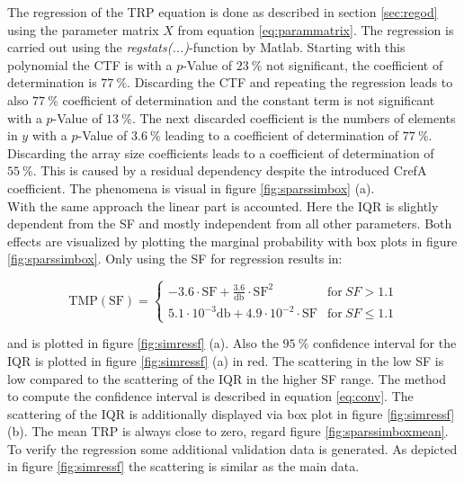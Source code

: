 The regression of the \ac{TRP} equation is done as described in section \ref{sec:regod} using the parameter matrix $X$ from equation \ref{eq:parammatrix}. The regression is carried out using the \textit{regstats(...)}-function by Matlab\texttrademark{}. Starting with this polynomial the \ac{CTF} is with a $p$-Value of $\SI{23}{\percent}$ not significant, the coefficient of determination is $\SI{77}{\percent}$. Discarding the \ac{CTF} and repeating the regression leads to also $\SI{77}{\percent}$ coefficient of determination and the constant term is not significant with a $p$-Value of $\SI{13}{\percent}$. The next discarded coefficient is the numbers of elements in $y$ with a  $p$-Value of $\SI{3.6}{\percent}$ leading to a coefficient of determination of $\SI{77}{\percent}$. Discarding the array size coefficients leads to a coefficient of determination of $\SI{55}{\percent}$. This is caused by a residual dependency despite the introduced \ac{CrefA} coefficient. The phenomena is visual in figure \ref{fig:sparssimbox} (a).\\
With the same approach the linear part is accounted. Here the \ac{IQR} is slightly dependent from the \ac{SF} and mostly independent from all other parameters. Both effects are visualized by plotting the marginal probability with box plots in figure \ref{fig:sparssimbox}. Only using the \ac{SF} for regression results in:

\begin{equation}
\text{TMP}\left(\text{SF}\right)=\begin{cases} -3.6\cdot\text{SF}+\frac{3.6}{\si{\decibel}}\cdot\text{SF}^2 & \text{for}\ SF>1.1\\
5.1\cdot 10^{-3}\si{\decibel}+4.9\cdot 10^{-2}\cdot \text{SF} & \text{for}\ SF\le 1.1\end{cases}
\end{equation}

and is plotted in figure \ref{fig:simressf} (a). Also the $\SI{95}{\percent}$ confidence interval for the \ac{IQR} is plotted in figure \ref{fig:simressf} (a) in red. The scattering in the low \ac{SF} is low compared to the scattering of the \ac{IQR} in the higher \ac{SF} range. The method to compute the confidence interval is described in equation \ref{eq:conv}. The scattering of the \ac{IQR} is additionally displayed via box plot in figure \ref{fig:simressf} (b). The mean \ac{TRP} is always close to zero, regard figure \ref{fig:sparssimboxmean}. To verify the regression some additional validation data is generated. As depicted in figure \ref{fig:simressf} the scattering is similar as the main data.

